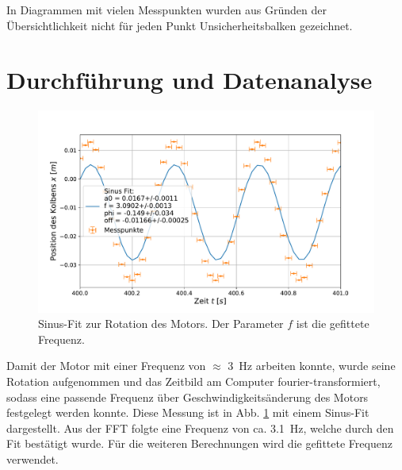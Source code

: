 		In Diagrammen mit vielen Messpunkten wurden aus Gründen der Übersichtlichkeit nicht für jeden Punkt Unsicherheitsbalken gezeichnet.
		
\section{Durchführung und Datenanalyse}	
	\begin{figure}[ht]
		\centering
		\includegraphics[width=\textwidth]{data/Position.pdf}
		\caption{Sinus-Fit zur Rotation des Motors. Der Parameter $f$ ist die gefittete Frequenz.}
		\label{fig:Frequenz}	
	\end{figure}
	Damit der Motor mit einer Frequenz von $\approx$ \SI{3}{\hertz} arbeiten konnte, wurde seine Rotation aufgenommen und das Zeitbild am Computer fourier-transformiert, sodass eine passende Frequenz über Geschwindigkeitsänderung des Motors festgelegt werden konnte.
	Diese Messung ist in Abb. \ref{fig:Frequenz} mit einem Sinus-Fit dargestellt.
	Aus der FFT folgte eine Frequenz von ca. \SI{3,1}{\hertz}, welche durch den Fit bestätigt wurde.
	Für die weiteren Berechnungen wird die gefittete Frequenz verwendet.
	

